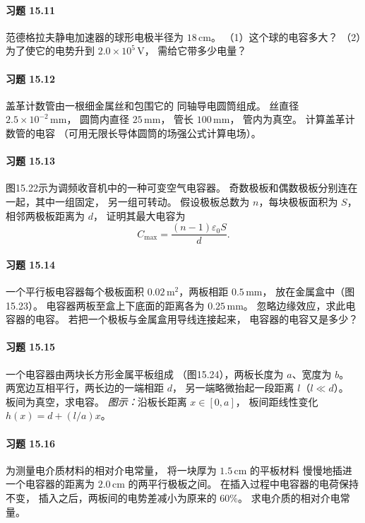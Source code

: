 \paragraph{习题 15.11}
范德格拉夫静电加速器的球形电极半径为
\(18\,\mathrm{cm}\)。
（1）这个球的电容多大？
（2）为了使它的电势升到
\(2.0\times10^5\,\mathrm V\)，
需给它带多少电量？

\paragraph{习题 15.12}
盖革计数管由一根细金属丝和包围它的
同轴导电圆筒组成。
丝直径 \(2.5\times10^{-2}\,\mathrm{mm}\)，
圆筒内直径 \(25\,\mathrm{mm}\)，
管长 \(100\,\mathrm{mm}\)，
管内为真空。
计算盖革计数管的电容
（可用无限长导体圆筒的场强公式计算电场）。

\paragraph{习题 15.13}
图15.22示为调频收音机中的一种可变空气电容器。
奇数极板和偶数极板分别连在一起，其中一组固定，
另一组可转动。
假设极板总数为 \(n\)，每块极板面积为 \(S\)，
相邻两极板距离为 \(d\)，
证明其最大电容为
\[
 C_{\max}=\frac{(n-1)\varepsilon_0S}{d}.
\]

\paragraph{习题 15.14}
一个平行板电容器每个极板面积
\(0.02\,\mathrm{m^2}\)，两板相距 \(0.5\,\mathrm{mm}\)，
放在金属盒中（图15.23）。
电容器两板至盒上下底面的距离各为
\(0.25\,\mathrm{mm}\)。
忽略边缘效应，求此电容器的电容。
若把一个极板与金属盒用导线连接起来，
电容器的电容又是多少？

\paragraph{习题 15.15}
一个电容器由两块长方形金属平板组成
（图15.24），两板长度为 \(a\)、宽度为 \(b\)。
两宽边互相平行，两长边的一端相距 \(d\)，
另一端略微抬起一段距离 \(l\)（\(l\ll d\)）。
板间为真空，求电容。
\textit{图示：}沿板长距离 \(x\in[0,a]\)，
板间距线性变化 \(h(x)=d+(l/a)x\)。

\paragraph{习题 15.16}
为测量电介质材料的相对介电常量，
将一块厚为 \(1.5\,\mathrm{cm}\) 的平板材料
慢慢地插进一个电容器的距离为
\(2.0\,\mathrm{cm}\) 的两平行极板之间。
在插入过程中电容器的电荷保持不变，
插入之后，两板间的电势差减小为原来的
\(60\%\)。
求电介质的相对介电常量。

